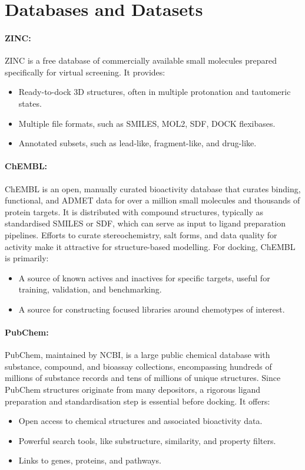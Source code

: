\documentclass[12pt]{article}
\begin{document}
\section{Databases and Datasets}

\paragraph{ZINC:}

ZINC\cite{CH6_Irwin2005} is a free database of commercially available small molecules prepared specifically for virtual screening. It provides:
\begin{itemize}
  \item Ready-to-dock 3D structures, often in multiple protonation and tautomeric states.
  \item Multiple file formats, such as SMILES, MOL2, SDF, DOCK flexibases.
  \item Annotated subsets, such as lead-like, fragment-like, and drug-like.
\end{itemize}

\paragraph{ChEMBL:}

ChEMBL\cite{CH6_Gaulton2012} is an open, manually curated bioactivity database that curates binding, functional, and ADMET data for over a million small molecules and thousands of protein targets. It is distributed with compound structures, typically as standardised SMILES or SDF, which can serve as input to ligand preparation pipelines. Efforts to curate stereochemistry, salt forms, and data quality for activity make it attractive for structure-based modelling.
For docking, ChEMBL is primarily:
\begin{itemize}
  \item A source of known actives and inactives for specific targets, useful for training, validation, and benchmarking.
  \item A source for constructing focused libraries around chemotypes of interest.
\end{itemize}

\paragraph{PubChem:}

PubChem\cite{CH6_KimPubChem}, maintained by NCBI, is a large public chemical database with substance, compound, and bioassay collections, encompassing hundreds of millions of substance records and tens of millions of unique structures. Since PubChem structures originate from many depositors, a rigorous ligand preparation and standardisation step is essential before docking. It offers:
\begin{itemize}
  \item Open access to chemical structures and associated bioactivity data.
  \item Powerful search tools, like substructure, similarity, and property filters.
  \item Links to genes, proteins, and pathways.
\end{itemize}
\end{document}
